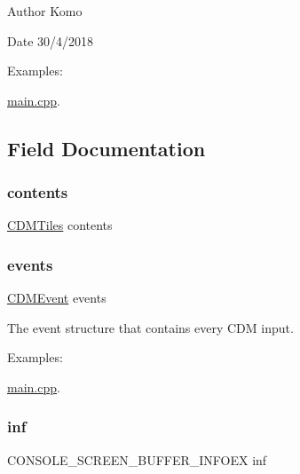 \begin{DoxyAuthor}{Author}
Komo 
\end{DoxyAuthor}
\begin{DoxyDate}{Date}
30/4/2018 
\end{DoxyDate}
\begin{Desc}
\item[Examples\+: ]\par
\mbox{\hyperlink{main_8cpp-example}{main.\+cpp}}.\end{Desc}


\subsection{Field Documentation}
\mbox{\label{struct_c_d_m_context_ac8c52228a53211702c5785f9c82e2f83}} 
\subsubsection{\texorpdfstring{contents}{contents}}
{\footnotesize\ttfamily \mbox{\hyperlink{struct_c_d_m_tiles}{C\+D\+M\+Tiles}} contents}

\mbox{\label{struct_c_d_m_context_ab97a0f3b9d5615487c4e542601499e94}} 
\subsubsection{\texorpdfstring{events}{events}}
{\footnotesize\ttfamily \mbox{\hyperlink{struct_c_d_m_event}{C\+D\+M\+Event}} events}



The event structure that contains every C\+DM input. 

\begin{Desc}
\item[Examples\+: ]\par
\mbox{\hyperlink{main_8cpp-example}{main.\+cpp}}.\end{Desc}
\mbox{\label{struct_c_d_m_context_a8476715d51a87d0e92e46b9be0ecd138}} 
\subsubsection{\texorpdfstring{inf}{inf}}
{\footnotesize\ttfamily C\+O\+N\+S\+O\+L\+E\+\_\+\+S\+C\+R\+E\+E\+N\+\_\+\+B\+U\+F\+F\+E\+R\+\_\+\+I\+N\+F\+O\+EX inf}

